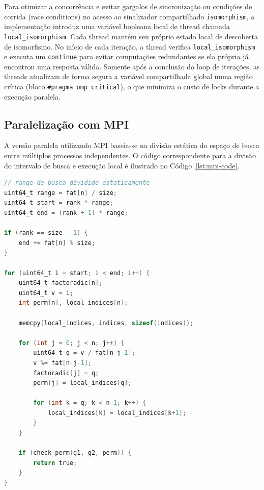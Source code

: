\documentclass[12pt,a4paper]{article}
\begin{document}
Para otimizar a concorrência e evitar gargalos de sincronização ou condições de corrida (race conditions) no acesso ao sinalizador compartilhado \texttt{isomorphism},
a implementação introduz uma variável booleana local de thread chamada \texttt{local\_isomorphism}.
Cada thread mantém seu próprio estado local de descoberta de isomorfismo.
No início de cada iteração,
a thread verifica \texttt{local\_isomorphism} e executa um \texttt{continue} para evitar computações redundantes se ela própria já encontrou uma resposta válida.
Somente após a conclusão do loop de iterações,
as threads atualizam de forma segura a variável compartilhada global numa região crítica (bloco \texttt{\#pragma omp critical}),
o que minimiza o custo de locks durante a execução paralela.

\subsection{Paralelização com MPI}

A versão paralela utilizando MPI baseia-se na divisão estática do espaço de busca entre múltiplos processos independentes.
O código correspondente para a divisão do intervalo de busca e execução local é ilustrado no Código~\ref{lst:mpi-code}.

\begin{lstlisting}[language=C, caption={Divisão estática do espaço de busca entre os processos MPI baseada em rank e size.}, label={lst:mpi-code}]
// range de busca dividido estaticamente
uint64_t range = fat[n] / size;
uint64_t start = rank * range;
uint64_t end = (rank + 1) * range;

if (rank == size - 1) {
    end += fat[n] % size;
}

for (uint64_t i = start; i < end; i++) {
    uint64_t factoradic[n];
    uint64_t v = i;
    int perm[n], local_indices[n];

    memcpy(local_indices, indices, sizeof(indices));

    for (int j = 0; j < n; j++) {
        uint64_t q = v / fat[n-j-1];
        v %= fat[n-j-1];
        factoradic[j] = q;
        perm[j] = local_indices[q];

        for (int k = q; k < n-1; k++) {
            local_indices[k] = local_indices[k+1];
        }
    }

    if (check_perm(g1, g2, perm)) {
        return true;
    }
}
\end{lstlisting}
\end{document}

